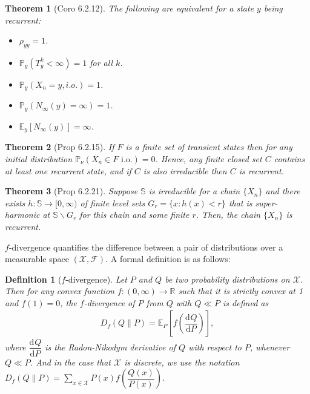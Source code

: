 \documentclass[11pt,a4paper]{article}
\numberwithin{equation}{section}%
\newtheorem{theorem}{Theorem}[]
\newtheorem{definition}{Definition}[]
\begin{document}
\begin{theorem}[Coro 6.2.12]
    The following are equivalent for a state $ y $ being recurrent:
    \begin{itemize}[topsep=0pt,itemsep=-8pt]
        \item $ \rho_{yy} = 1 $.
        \item $ \mathbb{P}_y(T_y^k < \infty) = 1 $ for all $ k $.
        \item $ \mathbb{P}_y(X_n = y, i.o.) = 1 $.
        \item $ \mathbb{P}_y(N_{\infty}(y) = \infty) = 1 $.
        \item $ \mathbb{E}_y[N_{\infty}(y)] = \infty $.
    \end{itemize}
\end{theorem}


\begin{theorem}[Prop 6.2.15]
    If $ F $ is a finite set of transient states then for any initial distribution $ \mathbb{P}_{\nu}(X_n \in F \text{ i.o.}) = 0 $. Hence, any finite closed set $ C $ contains at least one recurrent state, and if $ C $ is also irreducible then $ C $ is recurrent.
\end{theorem}


\begin{theorem}[Prop 6.2.21]

    Suppose $ \mathbb{S} $ is irreducible for a chain $ \{X_n\} $ and there exists $ h : \mathbb{S} \to [0, \infty) $ of finite level sets $ G_r = \{x : h(x) < r\} $ that is super-harmonic at $ \mathbb{S} \backslash G_r $ for this chain and some finite $ r $. Then, the chain $ \{X_n\} $ is recurrent.
\end{theorem}










$f$-divergence quantifies the difference between a pair of distributions over a measurable space $(\mathcal{X},\mathcal{F})$. A formal definition is as follows:
\begin{definition}[$ f $-divergence]
    Let $ P $ and $ Q $ be two probability distributions on $ \mathcal{ X }  $. Then for any convex function $ f : (0, \infty) \to \mathbb{R} $ such that it is strictly convex at 1 and $ f(1) = 0 $, the $ f $-divergence of $ P $ from $ Q $ with $ Q \ll P $ is defined as 
    \begin{align*}
        D_f(Q \| P) = \mathbb{E}_P[f(\dfrac{\mathrm{d}^{} Q }{\mathrm{d} P^{} })],
    \end{align*}
    where $ \dfrac{\mathrm{d}^{} Q }{\mathrm{d} P^{} } $ is the Radon-Nikodym derivative of $ Q $ with respect to $ P $, whenever $Q\ll P$. And in the case that $ \mathcal{ X }  $ is discrete, we use the notation $ D_f(Q \| P) = \sum_{x \in \mathcal{ X }  } P(x) f(\dfrac{Q(x)}{P(x)}) $.
    
\end{definition}
\end{document}
